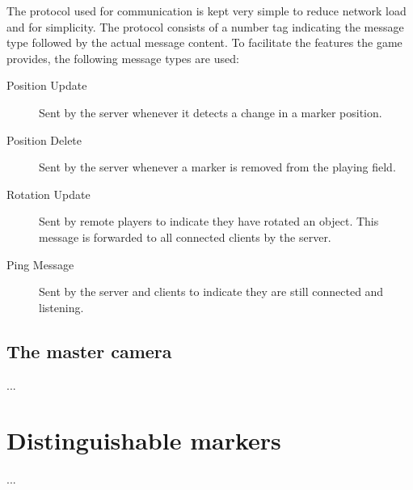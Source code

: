             The protocol used for communication is kept very simple to reduce 
            network load and for simplicity. The protocol consists of a number
            tag indicating the message type followed by the actual message 
            content. To facilitate the features the game provides, the following
            message types are used:
            
            \begin{description}
                \item[Position Update] Sent by the server whenever it detects a 
                                       change in a marker position.
                \item[Position Delete] Sent by the server whenever a marker is
                                       removed from the playing field.
                \item[Rotation Update] Sent by remote players to indicate they 
                                       have rotated an object. This message is 
                                       forwarded to all connected clients by the
                                       server.
                \item[Ping Message]    Sent by the server and clients to indicate 
                                       they are still connected and listening.
            \end{description}
        
        \subsection{The master camera} \label{ssec:mastercamera}
            ...
            
    \section{Distinguishable markers} \label{sec:markers}
        ...